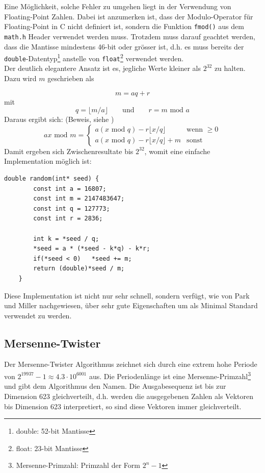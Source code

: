 \documentclass{book}
\begin{document}
\begin{refsection}
Eine Möglichkeit, solche Fehler zu umgehen liegt in der Verwendung von Floating-Point Zahlen. Dabei ist anzumerken ist, dass der Modulo-Operator für Floating-Point in C nicht definiert ist, sondern die Funktion \texttt{fmod()} aus dem \texttt{math.h} Header verwendet werden muss. Trotzdem muss darauf geachtet werden, dass die Mantisse mindestens 46-bit oder grösser ist, d.h. es muss bereits der \texttt{double}-Datentyp\footnote{double: 52-bit Mantisse} anstelle von \texttt{float}\footnote{float: 23-bit Mantisse} verwendet werden. \\

Der deutlich elegantere Ansatz ist es, jegliche Werte kleiner als $2^{32}$ zu halten. Dazu wird $m$ geschrieben als

\begin{equation}
	m = aq + r
\end{equation}
mit 
\begin{equation}
	q = \lfloor m/a \rfloor \qquad \text{und} \qquad r = m \text{ mod } a
\end{equation}
Daraus ergibt sich: (Beweis, siehe \cite{rng:ParkMiller1988})
\begin{equation}
	a x \text{ mod } m = 
		\begin{cases}
			a \left(x \text{ mod } q\right) - r \lfloor x / q\rfloor & \text{wenn }\geq 0 \\
			a \left(x \text{ mod } q\right) - r \lfloor x / q\rfloor + m & \text{sonst}
		\end{cases}
\end{equation}
Damit ergeben sich Zwischenresultate bis $2^{32}$, womit eine einfache Implementation möglich ist:

\begin{lstlisting}[style=C]
	double random(int* seed) {
		const int a = 16807;
		const int m = 2147483647;
		const int q = 127773;
		const int r = 2836;
		
		int k = *seed / q;
		*seed = a * (*seed - k*q) - k*r;
		if(*seed < 0)   *seed += m;
		return (double)*seed / m;
	}
\end{lstlisting}
Diese Implementation ist nicht nur sehr schnell, sondern verfügt, wie von Park und Miller \cite{rng:ParkMiller1988} nachgewiesen, über sehr gute Eigenschaften um als Minimal Standard verwendet zu werden.

\newpage
\subsection{Mersenne-Twister} \label{subsec:MersenneTwister}
Der Mersenne-Twister Algorithmus zeichnet sich durch eine extrem hohe Periode von $2^{19937}-1 \approx 4.3 \cdot 10^{6001}$ aus. Die Periodenlänge ist eine Mersenne-Primzahl\footnote{Mersenne-Primzahl: Primzahl der Form $2^{n}-1$} und gibt dem Algorithmus den Namen. Die Ausgabesequenz ist bis zur Dimension 623 gleichverteilt, d.h. werden die ausgegebenen Zahlen als Vektoren bis Dimension 623 interpretiert, so sind diese Vektoren immer gleichverteilt. \\


\end{refsection}
\end{document}
